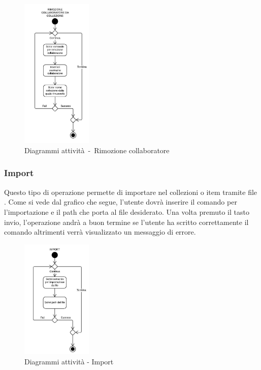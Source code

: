 \documentclass{scalatekids-article}
\begin{document}
\begin{figure}[H]
  \begin{center}
    \includegraphics[width=0.3\textwidth, keepaspectratio]{img/diagrammiAttivita/rimozioneCollaboratore.jpeg}
    \caption{Diagrammi attività\ -\ Rimozione collaboratore}
  \end{center}
\end{figure}

\subsubsection{Import}

Questo tipo di operazione permette di importare nel  collezioni o item
tramite file . Come si vede dal grafico che segue, l'utente dovrà
inserire il comando per l'importazione e il path che porta al file desiderato.
Una volta premuto il tasto invio, l'operazione andrà a buon termine se
l'utente ha scritto correttamente il comando altrimenti verrà visualizzato un
messaggio di errore.

\begin{figure}[H]
  \begin{center}
    \includegraphics[width=0.3\textwidth, keepaspectratio]{img/diagrammiAttivita/import.jpeg}
    \caption{Diagrammi attività - Import}
  \end{center}
\end{figure}
\end{document}
